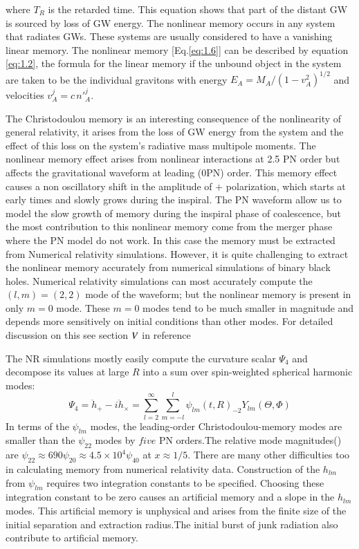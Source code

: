 \documentclass[prd,preprintnumbers,twocolumn,eqsecnum,floatfix,letter]{revtex4}
\newcommand{\RomanNumeralCaps}[1]{\MakeUppercase{\romannumeral #1}}
\begin{document}
where $T_{R}$ is the retarded time. This equation shows that part of the distant GW is sourced by loss of GW energy. The nonlinear memory occurs in any system that radiates GWs. These systems are usually considered to have a vanishing linear memory. The nonlinear memory [Eq.\ref{eq:1.6}] can be described by equation \ref{eq:1.2}, the formula for the linear memory if the unbound object in the system are taken to be the individual gravitons with energy $E_A = M_A/(1-v_A^2)^{1/2}$ and velocities $v_A^j = c\,{n'}_A^{j}$.\cite{Thorne1992} 
\par The Christodoulou memory is an interesting consequence of the nonlinearity of general relativity, it arises from the loss of GW energy from the system and the effect of this loss on the system's radiative mass multipole moments. The nonlinear memory effect arises from nonlinear interactions at 2.5 PN order but affects the gravitational waveform at leading (0PN) order. This memory effect causes a non oscillatory shift in the amplitude of $+$ polarization, which starts at early times and slowly grows during the inspiral. The PN waveform allow us to model the slow growth of memory during the inspiral phase of coalescence, but the most contribution to this nonlinear memory come from the merger phase where the PN model do not work. In this case the memory must be extracted from Numerical relativity simulations. However, it is quite challenging to extract the nonlinear memory accurately from numerical simulations of binary black holes. Numerical relativity simulations can most accurately compute the $(l, m) = (2, 2)$ mode of the waveform; but the nonlinear memory is present in only $m=0$ mode. These $m=0$ modes tend to be much smaller in magnitude and depends more sensitively on	initial conditions than other modes. For detailed discussion on this see section $\RomanNumeralCaps{5}$ in reference \cite{Favata2009}
\par The NR simulations mostly easily compute  the curvature scalar $\Psi_4$ and decompose its values at large $R$ into a sum over spin-weighted spherical harmonic modes:
\begin{equation}
	\Psi_4 = \ddot{h}_+ - \mathit{i}\ddot{h}_\times = \sum_{l=2}^{\infty}\sum_{m=-l}^{l}\psi_{lm}(t, R) _{-2}Y_{lm}(\Theta, \Phi)
\end{equation} 
In terms of the $\psi_{lm}$ modes, the leading-order Christodoulou-memory modes are smaller than the $\psi_{22}$ modes by $five$ PN orders.The relative mode magnitudes(\cite{Favata2009}) are $\psi_{22} \approx 690 \psi_{20}\approx 4.5 \times 10^4 \psi_{40}$ at $x\approx1/5$. There are many other difficulties too in calculating memory from numerical relativity data. Construction of the $h_{lm}$ from $\psi_{lm}$ requires two integration constants to be specified. Choosing these integration constant to be zero \cite{Reisswig_Pollney2011} causes an artificial memory and a slope in the $h_{lm}$ modes. This artificial memory is unphysical and arises from the finite size of the initial separation and extraction radius.The initial burst of junk radiation also contribute to artificial memory.
\end{document}
